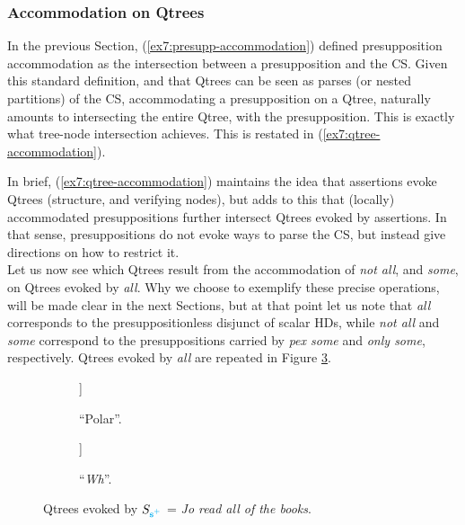 \subsubsection{Accommodation on Qtrees}

In the previous Section, (\ref{ex7:presupp-accommodation}) defined presupposition accommodation as the intersection between a presupposition and the CS. Given this standard definition, and that Qtrees can be seen as parses (or nested partitions) of the CS, accommodating a presupposition on a Qtree, naturally amounts to intersecting the entire Qtree, with the presupposition. This is exactly what tree-node intersection achieves. This is restated in (\ref{ex7:qtree-accommodation}).

\begin{exe}
	\label{ex7:qtree-accommodation}
\end{exe}

In brief, (\ref{ex7:qtree-accommodation}) maintains the idea that assertions evoke Qtrees (structure, and verifying nodes), but adds to this that (locally) accommodated presuppositions further intersect Qtrees evoked by assertions. In that sense, presuppositions do not evoke ways to parse the CS, but instead give directions on how to restrict it.\\


Let us now see which Qtrees result from the accommodation of \textit{not all}, and \textit{some}, on Qtrees evoked by \textit{all}. Why we choose to exemplify these precise operations, will be made clear in the next Sections, but at that point let us note that \textit{all} corresponds to the presuppositionless disjunct of scalar HDs, while \textit{not all} and \textit{some} correspond to the presuppositions carried by \textit{pex some} and \textit{only some}, respectively. Qtrees evoked by \textit{all} are repeated in Figure \ref{fig7:qtrees-all-r}.

\begin{figure}[H]
	\centering
	\begin{subfigure}[b]{.45\linewidth}
		\centering
		\begin{forest}
			[CS[$\neg\forall$][\fbox{$\forall$}]]
		\end{forest}
		\caption[]{``Polar''.}\label{fig7:qtree-all-polar-r}
	\end{subfigure}
	\hfill
	\begin{subfigure}[b]{.45\linewidth}
		\centering
		\begin{forest}
			[CS[$\neg\exists$][$\exists\wedge\neg\forall$][\fbox{$\forall$}]]
		\end{forest}
		\caption[]{``\textit{Wh}''.}\label{fig7:qtree-all-wh-r}
	\end{subfigure}
	\caption[]{Qtrees evoked by $S_{\textbf{\textcolor{cyan}{s$^+$}}}$ = \textit{Jo read all of the books}. }\label{fig7:qtrees-all-r}
\end{figure}

